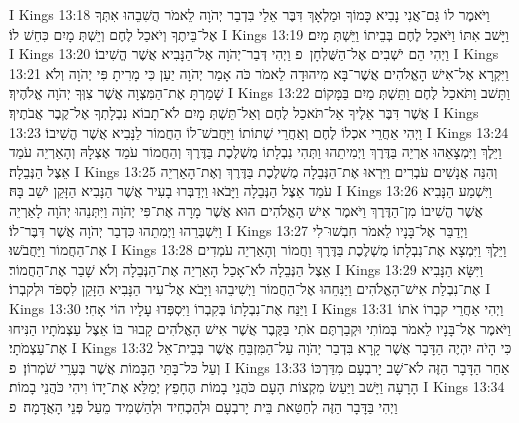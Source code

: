 I Kings 13:18	וַיֹּאמֶר לוֹ גַּם־אֲנִי נָבִיא כָּמוֹךָ וּמַלְאָךְ דִּבֶּר אֵלַי בִּדְבַר יְהֹוָה לֵאמֹר הֲשִׁבֵהוּ אִתְּךָ אֶל־בֵּיתֶךָ וְיֹאכַל לֶחֶם וְיֵשְׁתְּ מָיִם כִּחֵשׁ לוֹ׃
I Kings 13:19	וַיָּשׁב אִתּוֹ וַיֹּאכַל לֶחֶם בְּבֵיתוֹ וַיֵּשְׁתְּ מָיִם׃
I Kings 13:20	וַיְהִי הֵם יֹשְׁבִים אֶל־הַשֻּׁלְחָן {פ} וַיְהִי דְּבַר־יְהֹוָה אֶל־הַנָּבִיא אֲשֶׁר הֱשִׁיבוֹ׃
I Kings 13:21	וַיִּקְרָא אֶל־אִישׁ הָאֱלֹהִים אֲשֶׁר־בָּא מִיהוּדָה לֵאמֹר כֹּה אָמַר יְהֹוָה יַעַן כִּי מָרִיתָ פִּי יְהֹוָה וְלֹא שָׁמַרְתָּ אֶת־הַמִּצְוָה אֲשֶׁר צִוְּךָ יְהֹוָה אֱלֹהֶיךָ׃
I Kings 13:22	וַתָּשׁב וַתֹּאכַל לֶחֶם וַתֵּשְׁתְּ מַיִם בַּמָּקוֹם אֲשֶׁר דִּבֶּר אֵלֶיךָ אַל־תֹּאכַל לֶחֶם וְאַל־תֵּשְׁתְּ מָיִם לֹא־תָבוֹא נִבְלָתְךָ אֶל־קֶבֶר אֲבֹתֶיךָ׃
I Kings 13:23	וַיְהִי אַחֲרֵי אכְלוֹ לֶחֶם וְאַחֲרֵי שְׁתוֹתוֹ וַיַּחֲבשׁ־לוֹ הַחֲמוֹר לַנָּבִיא אֲשֶׁר הֱשִׁיבוֹ׃
I Kings 13:24	וַיֵּלֶךְ וַיִּמְצָאֵהוּ אַרְיֵה בַּדֶּרֶךְ וַיְמִיתֵהוּ וַתְּהִי נִבְלָתוֹ מֻשְׁלֶכֶת בַּדֶּרֶךְ וְהַחֲמוֹר עֹמֵד אֶצְלָהּ וְהָאַרְיֵה עֹמֵד אֵצֶל הַנְּבֵלָה׃
I Kings 13:25	וְהִנֵּה אֲנָשִׁים עֹבְרִים וַיִּרְאוּ אֶת־הַנְּבֵלָה מֻשְׁלֶכֶת בַּדֶּרֶךְ וְאֶת־הָאַרְיֵה עֹמֵד אֵצֶל הַנְּבֵלָה וַיָּבֹאוּ וַיְדַבְּרוּ בָעִיר אֲשֶׁר הַנָּבִיא הַזָּקֵן יֹשֵׁב בָּהּ׃
I Kings 13:26	וַיִּשְׁמַע הַנָּבִיא אֲשֶׁר הֱשִׁיבוֹ מִן־הַדֶּרֶךְ וַיֹּאמֶר אִישׁ הָאֱלֹהִים הוּא אֲשֶׁר מָרָה אֶת־פִּי יְהֹוָה וַיִּתְּנֵהוּ יְהֹוָה לָאַרְיֵה וַיִּשְׁבְּרֵהוּ וַיְמִתֵהוּ כִּדְבַר יְהֹוָה אֲשֶׁר דִּבֶּר־לוֹ׃
I Kings 13:27	וַיְדַבֵּר אֶל־בָּנָיו לֵאמֹר חִבְשׁוּ־לִי אֶת־הַחֲמוֹר וַיַּחֲבֹשׁוּ׃
I Kings 13:28	וַיֵּלֶךְ וַיִּמְצָא אֶת־נִבְלָתוֹ מֻשְׁלֶכֶת בַּדֶּרֶךְ וַחֲמוֹר וְהָאַרְיֵה עֹמְדִים אֵצֶל הַנְּבֵלָה לֹא־אָכַל הָאַרְיֵה אֶת־הַנְּבֵלָה וְלֹא שָׁבַר אֶת־הַחֲמוֹר׃
I Kings 13:29	וַיִּשָּׂא הַנָּבִיא אֶת־נִבְלַת אִישׁ־הָאֱלֹהִים וַיַּנִּחֵהוּ אֶל־הַחֲמוֹר וַיְשִׁיבֵהוּ וַיָּבֹא אֶל־עִיר הַנָּבִיא הַזָּקֵן לִסְפֹּד וּלְקבְרוֹ׃
I Kings 13:30	וַיַּנַּח אֶת־נִבְלָתוֹ בְּקִבְרוֹ וַיִּסְפְּדוּ עָלָיו הוֹי אָחִי׃
I Kings 13:31	וַיְהִי אַחֲרֵי קבְרוֹ אֹתוֹ וַיֹּאמֶר אֶל־בָּנָיו לֵאמֹר בְּמוֹתִי וּקְבַרְתֶּם אֹתִי בַּקֶּבֶר אֲשֶׁר אִישׁ הָאֱלֹהִים קָבוּר בּוֹ אֵצֶל עַצְמֹתָיו הַנִּיחוּ אֶת־עַצְמֹתָי׃
I Kings 13:32	כִּי הָיֹה יִהְיֶה הַדָּבָר אֲשֶׁר קָרָא בִּדְבַר יְהֹוָה עַל־הַמִּזְבֵּחַ אֲשֶׁר בְּבֵית־אֵל וְעַל כּל־בָּתֵּי הַבָּמוֹת אֲשֶׁר בְּעָרֵי שֹׁמְרוֹן׃ {פ}
I Kings 13:33	אַחַר הַדָּבָר הַזֶּה לֹא־שָׁב יָרבְעָם מִדַּרְכּוֹ הָרָעָה וַיָּשׁב וַיַּעַשׂ מִקְצוֹת הָעָם כֹּהֲנֵי בָמוֹת הֶחָפֵץ יְמַלֵּא אֶת־יָדוֹ וִיהִי כֹּהֲנֵי בָמוֹת׃
I Kings 13:34	וַיְהִי בַּדָּבָר הַזֶּה לְחַטַּאת בֵּית יָרבְעָם וּלְהַכְחִיד וּלְהַשְׁמִיד מֵעַל פְּנֵי הָאֲדָמָה׃ {פ}
